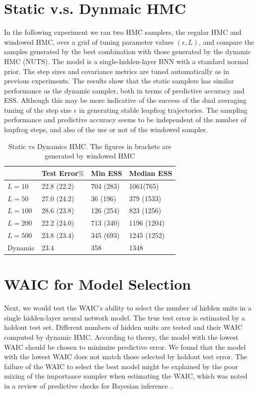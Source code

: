 \documentclass[12pt]{report}
\begin{document}
\section{Static  v.s. Dynmaic HMC}
In the following experiment we ran two HMC samplers, the regular HMC and windowed HMC, over a grid of tuning parameter values $(\epsilon,L)$, and compare the samples generated by the best combination with those generated by the dynamic HMC (NUTS). The model is a single-hidden-layer BNN with a standard normal prior.
The step sizes and covariance metrics are tuned automatically as in previous experiments. The results show that the static samplers has similar performance as the dynamic sampler, both in terms of predictive accuracy and ESS. Although this may be more indicative of the success of the dual averaging tuning of the step size $\epsilon$ in generating stable leapfrog trajectories. The sampling performance and predictive accuracy seems to be independent of the number of leapfrog steps, and also of the use or not of the windowed sampler. 
\begin{table}[]
\centering
\begin{tabular}{@{}llll@{}}
\toprule
        & Test Error$\%$ & Min ESS & Median ESS \\ \midrule
$L = 10 $  & 22.8 (22.2)    & 704 (283) & 1061(765)       \\ \midrule
$L = 50 $  & 27.0 (24.2)  & 36 (196)  & 379 (1533)     \\ \midrule
$L = 100  $  & 28.6 (23.8)  & 126 (254)  & 823 (1256)    \\ \midrule
$L = 200  $   & 22.2 (24.0)    & 713 (340)      & 1196 (1204)         \\ \midrule
$L = 500   $ & 23.8  (23.4)       & 345 (693)      & 1245  (1252)        \\ \midrule
Dynamic & 23.4         & 358       & 1348         \\ \bottomrule 
\end{tabular}
\caption{Static vs Dynamics HMC. The figures in brackets are generated by windowed HMC}
\label{my-label}
\end{table}

\section{WAIC for Model Selection}
Next, we would test the WAIC's ability to select the number of hidden units in a single hidden-layer neural network model. The true test error is estimated by a holdout test set. Different numbers of hidden units are tested and their WAIC computed by dynamic HMC. According to theory, the model with the lowest WAIC should be chosen to minimize predictive error.
We found that the model with the lowest WAIC does not match those selected by holdout test error. The failure of the WAIC to select the best model might be explained by the poor mixing of the importance sampler when estimating the WAIC, which was noted in a review of predictive checks for Bayesian inference \cite{vehtari2017practical} . 
\end{document}
